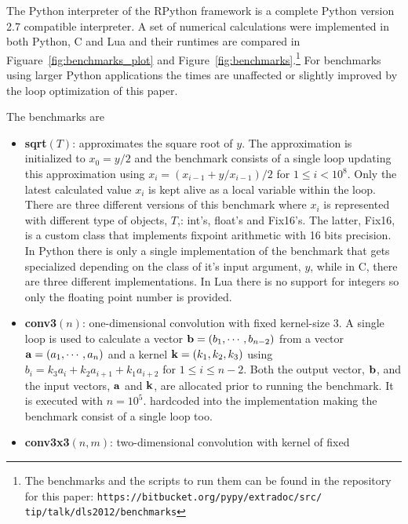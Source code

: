 \documentclass[preprint]{sigplanconf}
\begin{document}
The Python interpreter of the RPython framework is a complete Python
version 2.7 compatible interpreter. A set of numerical
calculations were implemented in both Python, C and Lua and their
runtimes are compared in Figuare~\ref{fig:benchmarks_plot} and Figure~\ref{fig:benchmarks}.\footnote{
    The benchmarks and the scripts to run them can be found in the repository for this paper:
    \texttt{https://bitbucket.org/pypy/extradoc/src/ tip/talk/dls2012/benchmarks}
}
For benchmarks using larger Python applications the times are unaffected or
slightly improved by the loop optimization of this paper.

The benchmarks are
\begin{itemize}
\item {\bf sqrt}$\left(T\right)$: approximates the square root of $y$. The approximation is 
initialized to $x_0=y/2$ and the benchmark consists of a single loop updating this
approximation using $x_i = \left( x_{i-1} + y/x_{i-1} \right) / 2$ for $1\leq i < 10^8$. 
Only the latest calculated value $x_i$ is kept alive as a local variable within the loop.
There are three different versions of this benchmark where $x_i$
  is represented with different type of objects, $T$,: int's, float's and
  Fix16's. The latter, Fix16, is a custom class that implements
  fixpoint arithmetic with 16 bits precision. In Python there is only
  a single implementation of the benchmark that gets specialized
  depending on the class of it's input argument, $y$, while in C,
  there are three different implementations. In Lua there is no support for
  integers so only the floating point number is provided.
\item {\bf conv3}$\left(n\right)$: one-dimensional convolution with fixed kernel-size $3$. A single loop
is used to calculate a vector ${\bf b} = \left(b_1, \cdots, b_{n-2}\right)$ from a vector
${\bf a} = \left(a_1, \cdots, a_n\right)$ and a kernel ${\bf k} = \left(k_1, k_2, k_3\right)$ using 
$b_i = k_3 a_i + k_2 a_{i+1} + k_1 a_{i+2}$ for $1 \leq i \leq n-2$. Both the output vector, $\bf b$, 
and the input vectors, $\bf a$ and $\bf k$, are allocated prior to running the benchmark. It is executed 
with $n=10^5$.
hardcoded into the implementation making the benchmark consist of a single loop too.
\item {\bf conv3x3}$\left(n,m\right)$: two-dimensional convolution with kernel of fixed

\end{itemize}
\end{document}
